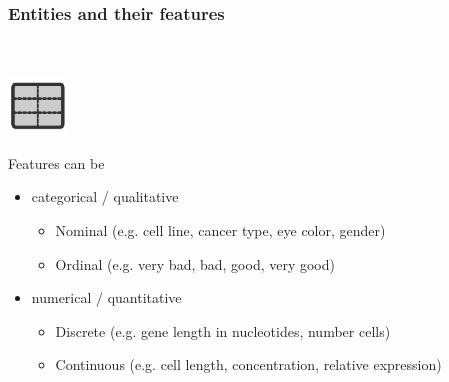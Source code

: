 \documentclass[aspectratio=169]{beamer}
\begin{document}
\begin{frame}
  \frametitle{Entities and their features}    
  \begin{block}{}
    \vspace{0.5cm}
    \ \ \ \
    \begin{minipage}{0.10\textwidth}
      \begin{center}
        \includegraphics[width=1.6cm]{images/publicdomainvectors_ftdissociatecell.pdf}
      \end{center}        
    \end{minipage}
    \hfill
    \begin{minipage}{0.80\textwidth}

      Features can be\\
      \begin{itemize}
        \item categorical / qualitative
          \begin{itemize}
          \item Nominal (e.g. cell line, cancer type, eye color, gender)
          \item Ordinal (e.g. very bad, bad, good, very good)
          \end{itemize}
        \item numerical / quantitative
          \begin{itemize}
          \item Discrete (e.g. gene length in nucleotides, number cells)
          \item Continuous (e.g. cell length, concentration, relative expression) 
          \end{itemize}
      \end{itemize}
      
    \end{minipage}
    \vspace{0.3cm}
  \end{block}
\end{frame}
\end{document}

